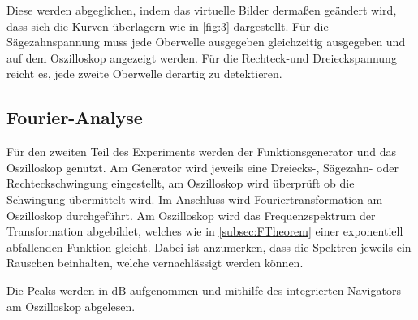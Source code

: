\noindent Diese werden abgeglichen, indem das virtuelle Bilder dermaßen geändert wird, 
dass sich die Kurven überlagern wie in \autoref{fig:3} dargestellt.
Für die Sägezahnspannung muss jede Oberwelle ausgegeben gleichzeitig ausgegeben 
und auf dem Oszilloskop angezeigt werden.
Für die Rechteck-und Dreieckspannung reicht es, jede zweite Oberwelle derartig 
zu detektieren.

\subsection{Fourier-Analyse}
Für den zweiten Teil des Experiments werden der Funktionsgenerator und das 
Oszilloskop genutzt. Am Generator wird jeweils eine Dreiecks-, Sägezahn- oder 
Rechteckschwingung eingestellt, am Oszilloskop wird überprüft ob die Schwingung 
übermittelt wird. Im Anschluss wird Fouriertransformation am Oszilloskop
durchgeführt. Am Oszilloskop wird das Frequenzspektrum der Transformation 
abgebildet, welches wie in \autoref{subsec:FTheorem} einer exponentiell abfallenden 
Funktion gleicht. Dabei ist anzumerken, dass die Spektren jeweils ein Rauschen 
beinhalten, welche vernachlässigt werden können. 

\noindent Die Peaks werden in $\unit{\deci\bel}$ aufgenommen und mithilfe des
integrierten Navigators am Oszilloskop abgelesen.